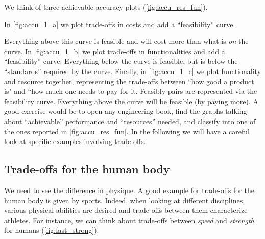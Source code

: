 We think of three achievable accuracy plots (\cref{fig:accu_res_fun}).

In \cref{fig:accu_1_a} we plot trade-offs in costs and add a ``feasibility'' curve.

\begin{figure*}[b]
    \begin{center}
        \hspace{0.5cm}
        \hspace{0.5cm}
    \end{center}
    \caption{}
    \label{fig:accu_res_fun}
\end{figure*}

Everything above this curve is feasible and will cost more than what is \emph{on} the curve.
In \cref{fig:accu_1_b} we plot trade-offs in functionalities and add a ``feasibility'' curve.
Everything below the curve is feasible, but is below the ``standards'' required by the curve.
Finally, in \cref{fig:accu_1_c} we plot functionality and resource together, representing the trade-offs between ``how good a product is" and ``how much one needs to pay for it.
Feasibly pairs are represented via the feasibility curve.
Everything above the curve will be feasible (by paying more).
A good exercise would be to open any engineering book, find the graphs talking about ``achievable'' performance and ``resources'' needed, and classify into one of the ones reported in \cref{fig:accu_res_fun}.
In the following we will have a careful look at specific examples involving trade-offs.

\vfill
\clearpage

\subsection{Trade-offs for the human body}

We need to see the difference in physique.
A good example for trade-offs for the human body is given by sports.
Indeed, when looking at different disciplines, various physical abilities are desired and trade-offs between them characterize athletes.
For instance, we can think about trade-offs between \emph{speed} and \emph{strength} for humans (\cref{fig:fast_strong}).

